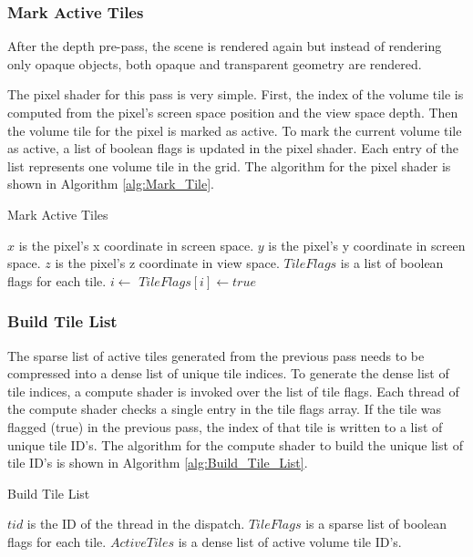 \subsubsection{Mark Active Tiles}
\label{sec:Mark_Active_Tiles}

After the depth pre-pass, the scene is rendered again but instead of rendering only opaque objects, both opaque and transparent geometry are rendered.

The pixel shader for this pass is very simple. First, the index of the volume tile is computed from the pixel's screen space position and the view space depth. Then the volume tile for the pixel is marked as active. To mark the current volume tile as active, a list of boolean flags is updated in the pixel shader. Each entry of the list represents one volume tile in the grid. The algorithm for the pixel shader is shown in Algorithm \ref{alg:Mark_Tile}.

\begin{algorithm}[h]
\caption{Mark Active Tiles}
\label{alg:Mark_Tile}
\begin{algorithmic}[1]
\Require $x$ is the pixel's x coordinate in screen space.
\Require $y$ is the pixel's y coordinate in screen space.
\Require $z$ is the pixel's z coordinate in view space.
\Require $TileFlags$ is a list of boolean flags for each tile.
\State $i \gets$ 
\State $TileFlags[i] \gets true$
\EndFunction
\end{algorithmic}
\end{algorithm}


\subsubsection{Build Tile List}
\label{sec:Build_Tile_List}

The sparse list of active tiles generated from the previous pass needs to be compressed into a dense list of unique tile indices. To generate the dense list of tile indices, a compute shader is invoked over the list of tile flags. Each thread of the compute shader checks a single entry in the tile flags array. If the tile was flagged (true) in the previous pass, the index of that tile is written to a list of unique tile ID's. The algorithm for the compute shader to build the unique list of tile ID's is shown in Algorithm \ref{alg:Build_Tile_List}.

\begin{algorithm}[h]
\caption{Build Tile List}
\label{alg:Build_Tile_List}
\begin{algorithmic}[1]
\Require $tid$ is the ID of the thread in the dispatch.
\Require $TileFlags$ is a sparse list of boolean flags for each tile.
\Ensure $ActiveTiles$ is a dense list of active volume tile ID's.
\State {}
\EndIf
\EndFunction
\end{algorithmic}
\end{algorithm}

